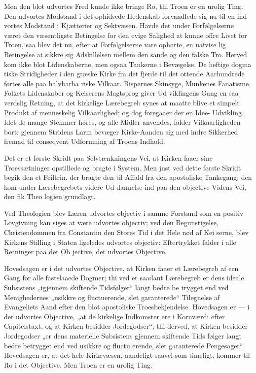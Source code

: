 \documentclass[12pt]{book}
\newcommand{\opage}[1]{\marginnote{\footnotesize\textit{[#1]}}}
\begin{document}
Men den blot udvortes Fred kunde ikke bringe Ro,
thi Troen er en urolig Ting. Den udvortes Modstand
i det ophidsede Hedenskab forvandlede sig nu til en ind\-%
vortes Modstand i Kjætterier og Sektvæsen. Havde det
\opage{259}\setcounter{footnote}{0}%
under Forfølgelserne været den væsentligste Betingelse
for den evige Salighed at kunne offre Livet for Troen, saa
blev det nu, efter at Forfølgelserne vare ophørte, en uafvise\-%
lig Betingelse at sikkre sig Adskillelsen mellem den sande
og den falske Tro. Herved kom ikke blot Lidenskaberne,
men ogsaa Tankerne i Bevægelse. De heftige dogma\-%
tiske Stridigheder i den græske Kirke fra det fjerde
til det ottende Aarhundrede førtes alle paa halvbarba\-%
riske Vilkaar. Bispernes Skinsyge, Munkenes Fanatisme,
Folkets Lidenskaber og Keiserens Magtsprog giver Ud\-%
viklingens Gang en saa verdslig Retning, at det kirkelige
Lærebegreb synes at maatte blive et simpelt Produkt af
menneskelig Vilkaarlighed; og dog foregaaer der en Idee-%
Udvikling. Idet de mange Stemmer høres, og alle Midler
anvendes, falder Vilkaarligheden bort: gjennem Stridens
Larm bevæger Kirke-Aanden sig med indre Sikkerhed
fremad til conseqvent Udformning af Troens Indhold.

Det er et første Skridt paa Selvtænkningens Vei, at
Kirken faaer sine Troessætninger opstillede og bragte i
System. Men just ved dette første Skridt begik den et
Feiltrin, der bragte den til Affald fra den apostoliske
Tankegang: den kom under Lærebegrebets videre Ud\-%
dannelse ind paa den objective Videns Vei, den fik Theo\-%
logien grundlagt.

Ved Theologien blev Læren udvortes objectiv i samme
Forstand som en positiv Lovgivning kan siges at være
udvortes objectiv; ved den Begunstigelse, Christendommen
fra Constantin den Stores Tid i det Hele nød af Kei\-%
serne, blev Kirkens Stilling i Staten ligeledes udvortes
objectiv: Eftertrykket falder i alle Retninger paa det Ob\-%
jective, det udvortes Objective.

Hovedsagen er i det udvortes Objective, at Kirken
faaer et Lærebegreb af een Gang for alle fastslaaede
Dogmer; thi ved et saadant Lærebegreb er dens ideale
\opage{260}\setcounter{footnote}{0}%
Subsistens „igjennem skiftende Tidsfølger“ langt bedre be\-%
trygget end ved Menighedernes „usikkre og fluctuerende,
slet garanterede“ Tilegnelse af Evangeliets Aand efter den
blot apostoliske Troesbekjendelse. Hovedsagen er --- i
det udvortes Objective, „at de kirkelige Indkomster ere
i Kornværdi efter Capitelstaxt, og at Kirken besidder
Jordegodser“; thi derved, at Kirken besidder Jordegodser
„er dens materielle Subsistens gjennem skiftende Tids\-%
følger langt bedre betrygget end ved usikkre og fluctu\-%
erende, slet garanterede Pengesager“. Hovedsagen er,
at det hele Kirkevæsen, aandeligt saavel som timeligt,
kommer til Ro i det Objective. Men Troen er en urolig
Ting.
\end{document}
